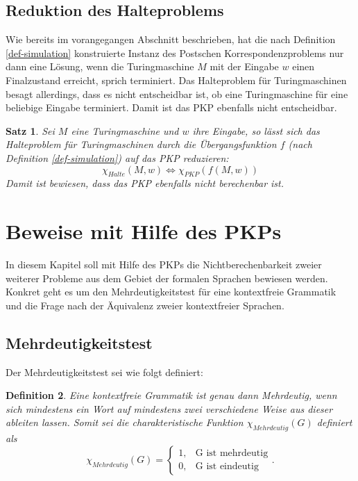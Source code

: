 \documentclass[]{scrartcl}
\newtheorem{definition}{Definition}[section]
\newtheorem{satz}[definition]{Satz}
\begin{document}
	\subsection{Reduktion des Halteproblems}
	
		Wie bereits im vorangegangen Abschnitt beschrieben, hat die nach Definition \ref{def-simulation} konstruierte Instanz des Postschen Korrespondenzproblems nur dann eine Lösung, wenn die Turingmaschine $M$ mit der Eingabe $w$ einen Finalzustand erreicht, sprich terminiert. Das Halteproblem für Turingmaschinen besagt allerdings, dass es nicht entscheidbar ist, ob eine Turingmaschine für eine beliebige Eingabe terminiert. Damit ist das PKP ebenfalls nicht entscheidbar.
		
		\begin{satz}
		Sei $M$ eine Turingmaschine und $w$ ihre Eingabe, so lässt sich das Halteproblem für Turingmaschinen durch die Übergangsfunktion $f$ (nach Definition \ref{def-simulation}) auf das PKP reduzieren:
		\[\chi_{Halte} (M, w) \Leftrightarrow \chi_{PKP}(f(M, w))\]
		Damit ist bewiesen, dass das PKP ebenfalls nicht berechenbar ist.
		\end{satz}

\section{Beweise mit Hilfe des PKPs}

	In diesem Kapitel soll mit Hilfe des PKPs die Nichtberechenbarkeit zweier weiterer Probleme aus dem Gebiet der formalen Sprachen bewiesen werden. Konkret geht es um den Mehrdeutigkeitstest für eine kontextfreie Grammatik und die Frage nach der Äquivalenz zweier kontextfreier Sprachen.
	
	\subsection{Mehrdeutigkeitstest}
		
		Der Mehrdeutigkeitstest sei wie folgt definiert:
		\begin{definition}
			Eine kontextfreie Grammatik ist genau dann Mehrdeutig, wenn sich mindestens ein Wort auf mindestens zwei verschiedene Weise aus dieser ableiten lassen. Somit sei die charakteristische Funktion $\chi_{Mehrdeutig}(G)$ definiert als
			  \[
			     \chi_{Mehrdeutig}(G)=\left\{\begin{array}{ll} 1, & \text{G ist mehrdeutig} \\
			         0, &\text{G ist eindeutig}\end{array}\right. .
			  \]
		\end{definition}
		
\end{document}
